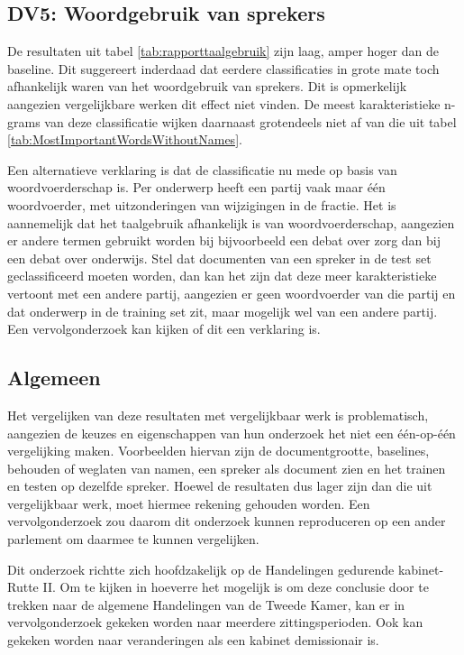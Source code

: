 \subsection{DV5: Woordgebruik van sprekers}
De resultaten uit tabel \ref{tab:rapporttaalgebruik} zijn laag, amper hoger dan de baseline. Dit suggereert inderdaad dat eerdere classificaties in grote mate toch afhankelijk waren van het woordgebruik van sprekers. Dit is opmerkelijk aangezien vergelijkbare werken dit effect niet vinden. De meest karakteristieke n-grams van deze classificatie wijken daarnaast grotendeels niet af van die uit tabel \ref{tab:MostImportantWordsWithoutNames}.\par
Een alternatieve verklaring is dat de classificatie nu mede op basis van woordvoerderschap is. Per onderwerp heeft een partij vaak maar één woordvoerder, met uitzonderingen van wijzigingen in de fractie. Het is aannemelijk dat het taalgebruik afhankelijk is van woordvoerderschap, aangezien er andere termen gebruikt worden bij bijvoorbeeld een debat over zorg dan bij een debat over onderwijs. Stel dat documenten van een spreker in de test set geclassificeerd moeten worden, dan kan het zijn dat deze meer karakteristieke vertoont met een andere partij, aangezien er geen woordvoerder van die partij en dat onderwerp in de training set zit, maar mogelijk wel van een andere partij. Een vervolgonderzoek kan kijken of dit een verklaring is.\par

\subsection{Algemeen}
Het vergelijken van deze resultaten met vergelijkbaar werk is problematisch, aangezien de keuzes en eigenschappen van hun onderzoek het niet een één-op-één vergelijking maken. Voorbeelden hiervan zijn de documentgrootte, baselines, behouden of weglaten van namen, een spreker als document zien en het trainen en testen op dezelfde spreker. Hoewel de resultaten dus lager zijn dan die uit vergelijkbaar werk, moet hiermee rekening gehouden worden. Een vervolgonderzoek zou daarom dit onderzoek kunnen reproduceren op een ander parlement om daarmee te kunnen vergelijken.\par
Dit onderzoek richtte zich hoofdzakelijk op de Handelingen gedurende kabinet-Rutte II. Om te kijken in hoeverre het mogelijk is om deze conclusie door te trekken naar de algemene Handelingen van de Tweede Kamer, kan er in vervolgonderzoek gekeken worden naar meerdere zittingsperioden. Ook kan gekeken worden naar veranderingen als een kabinet demissionair is.\par